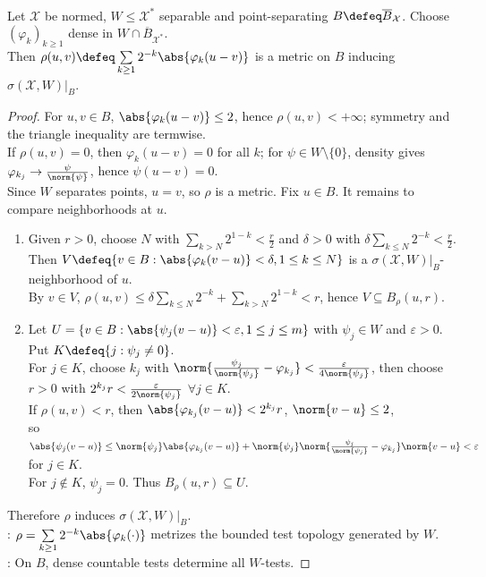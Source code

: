 \begin{theorem} \label{thm:separable-test-metrizes-weak-ball} \\
Let $\mathcal X$ be normed, $W\leq\mathcal X^*$ separable and point-separating $B\defeq\overline{B}_{\mathcal X}$. Choose $(\varphi_k)_{k\geq1}$ dense in $W\cap\overline{B}_{\mathcal X^*}$.\\
Then $\rho(u,v)\defeq\sum\limits_{k\geq1}2^{-k}\abs{\varphi_k(u-v)}$ is a metric on $B$ inducing $\sigma(\mathcal X,W)|_B$.
\begin{proof} For $u,v\in B$, $\abs{\varphi_k(u-v)}\leq2$, hence $\rho(u,v)<+\infty$; symmetry and the triangle inequality are termwise.\\
If $\rho(u,v)=0$, then $\varphi_k(u-v)=0$ for all $k$; for $\psi\in W\setminus\{0\}$, density gives $\varphi_{k_j}\to\frac{\psi}{\norm{\psi}}$, hence $\psi(u-v)=0$.\\
Since $W$ separates points, $u=v$, so $\rho$ is a metric.
Fix $u\in B$. It remains to compare neighborhoods at $u$.
\begin{enumerate}[label=\roman*.]
\setlength{\itemsep}{0pt}
\item[$(\Rightarrow)$] Given $r>0$, choose $N$ with $\sum\limits_{k>N}2^{1-k}<\frac{r}{2}$ and $\delta>0$ with $\delta\sum\limits_{k\leq N}2^{-k}<\frac{r}{2}$.\\
Then $V\defeq\{v\in B:\abs{\varphi_k(v-u)}<\delta, 1\leq k\leq N\}$ is a $\sigma(\mathcal X,W)|_B$-neighborhood of $u$.\\
By $v\in V$, $\rho(u,v)\leq\delta\sum\limits_{k\leq N}2^{-k}+\sum\limits_{k>N}2^{1-k}<r$, hence $V\subseteq B_\rho(u,r)$.
\item[$(\Leftarrow)$] Let $U=\{v\in B:\abs{\psi_j(v-u)}<\varepsilon, 1\leq j\leq m\}$ with $\psi_j\in W$ and $\varepsilon>0$. Put $K\defeq\{j:\psi_j\neq0\}$.\\
For $j\in K$, choose $k_j$ with $\norm{\frac{\psi_j}{\norm{\psi_j}}-\varphi_{k_j}}<\frac{\varepsilon}{4\norm{\psi_j}}$, then choose $r>0$ with $2^{k_j}r<\frac{\varepsilon}{2\norm{\psi_j}}$ $\forall j\in K$.\\
If $\rho(u,v)<r$, then $\abs{\varphi_{k_j}(v-u)}<2^{k_j}r$, $\norm{v-u}\leq2$,\\
so $\abs{\psi_j(v-u)}\leq\norm{\psi_j}\abs{\varphi_{k_j}(v-u)}+\norm{\psi_j}\norm{\frac{\psi_j}{\norm{\psi_j}}-\varphi_{k_j}}\norm{v-u}<\varepsilon$ for $j\in K$.\\
For $j\notin K$, $\psi_j=0$. Thus $B_\rho(u,r)\subseteq U$.
\end{enumerate}
Therefore $\rho$ induces $\sigma(\mathcal X,W)|_B$.\\
: $\rho=\sum\limits_{k\geq1}2^{-k}\abs{\varphi_k(\cdot)}$ metrizes the bounded test topology generated by $W$.\\
: On $B$, dense countable tests determine all $W$-tests.
\end{proof}
\end{theorem}

